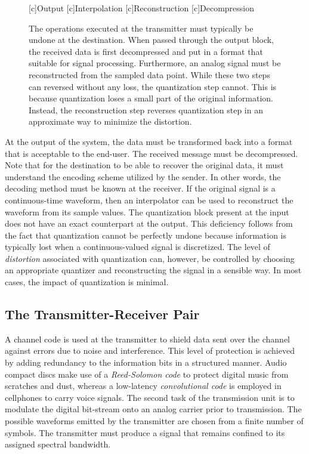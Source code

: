 \begin{figure}[htbp]
\begin{center}
\begin{psfrags}
[c]{Output}
[c]{Interpolation}
[c]{Reconstruction}
[c]{Decompression}
\end{psfrags}
\end{center}
\caption{The operations executed at the transmitter must typically be undone at the destination.
When passed through the output block, the received data is first decompressed and put in a format that suitable for signal processing.
Furthermore, an analog signal must be reconstructed from the sampled data point.
While these two steps can reversed without any loss, the quantization step cannot.
This is because quantization loses a small part of the original information.
Instead, the reconstruction step reverses quantization step in an approximate way to minimize the distortion.}
\label{figure:BlockOutput}
\end{figure}

At the output of the system, the data must be transformed back into a format that is acceptable to the end-user.
The received message must be decompressed.
Note that for the destination to be able to recover the original data, it must understand the encoding scheme utilized by the sender.
In other words, the decoding method must be known at the receiver.
If the original signal is a continuous-time waveform, then an interpolator can be used to reconstruct the waveform from its sample values.
The quantization block present at the input does not have an exact counterpart at the output.
This deficiency follows from the fact that quantization cannot be perfectly undone because information is typically lost when a continuous-valued signal is discretized.
The level of \emph{distortion} associated with quantization can, however, be controlled by choosing an appropriate quantizer and reconstructing the signal in a sensible way.
In most cases, the impact of quantization is minimal.


\subsection{The Transmitter-Receiver Pair}

A channel code is used at the transmitter to shield data sent over the channel against errors due to noise and interference.
This level of protection is achieved by adding redundancy to the information bits in a structured manner.
Audio compact discs make use of a \emph{Reed-Solomon code} to protect digital music from scratches and dust, whereas a low-latency \emph{convolutional code} is employed in cellphones to carry voice signals.
The second task of the transmission unit is to modulate the digital bit-stream onto an analog carrier prior to transmission.
The possible waveforms emitted by the transmitter are chosen from a finite number of symbols.
The transmitter must produce a signal that remains confined to its assigned spectral bandwidth.

